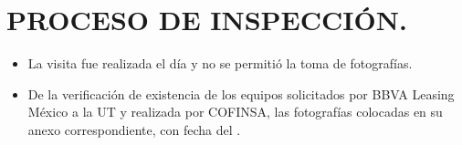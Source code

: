 
\chapter{PROCESO DE INSPECCIÓN.} %
\begin{itemize}
	\item La visita fue realizada el día \fechaInspeccion \hspace{1mm} y no se permitió la toma de fotografías.
	\item De la verificación de existencia de los equipos solicitados por BBVA Leasing México a la UT y realizada por COFINSA, las fotografías colocadas en su anexo correspondiente, con fecha del \fechaInspeccion.
\end{itemize}
